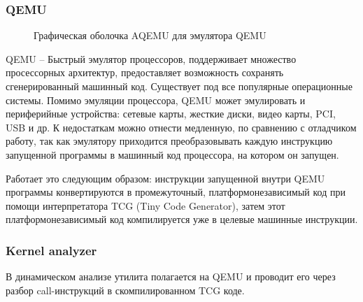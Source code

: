 \subsubsection{QEMU}\label{sec:ch1/sec3/sub2/sub3}
\begin{figure}[!htbp]
    \caption{Графическая оболочка AQEMU для эмулятора QEMU\label{fig:aqemu}}
\end{figure}
QEMU -- Быстрый эмулятор процессоров, поддерживает множество просессорных архитектур,
предоставляет возможность сохранять сгенерированный машинный код. Существует
под все популярные операционные системы.
Помимо эмуляции процессора, QEMU может эмулировать и периферийные устройства:
сетевые карты, жесткие диски, видео карты, PCI, USB и др.
К недостаткам можно отнести медленную, по сравнению с отладчиком работу,
так как эмулятору приходится преобразовывать каждую инструкцию запущенной программы
в машинный код процессора, на котором он запущен.

Работает это следующим образом:
инструкции запущенной внутри QEMU программы конвертируются в промежуточный,
платформонезависимый код при помощи интерпретатора TCG (Tiny Code Generator),
затем этот платформонезависимый код компилируется уже в целевые машинные инструкции.

\subsubsection{Kernel analyzer}\label{sec:ch1/sec3/sub1/sub3}
В динамическом анализе утилита полагается на QEMU и проводит его через
разбор call-инструкций в скомпилированном TCG коде.

